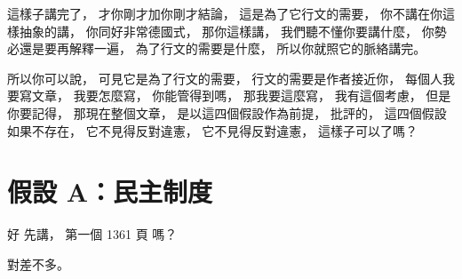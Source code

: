 \hypertarget{w06:cue:1276}{}這樣子講完了，
\hypertarget{w06:cue:1277}{}才你剛才加你剛才結論，
\hypertarget{w06:cue:1278}{}這是為了它行文的需要，
\hypertarget{w06:cue:1279}{}你不講在你這樣抽象的講，
\hypertarget{w06:cue:1280}{}你同好非常德國式，
\hypertarget{w06:cue:1281}{}那你這樣講，
\hypertarget{w06:cue:1282}{}我們聽不懂你要講什麼，
\hypertarget{w06:cue:1283}{}你勢必還是要再解釋一遍，
\hypertarget{w06:cue:1284}{}為了行文的需要是什麼，
\hypertarget{w06:cue:1285}{}所以你就照它的脈絡講完。

\hypertarget{w06:cue:1286}{}所以你可以說，
\hypertarget{w06:cue:1287}{}可見它是為了行文的需要，
\hypertarget{w06:cue:1288}{}行文的需要是作者接近你，
\hypertarget{w06:cue:1289}{}每個人我要寫文章，
\hypertarget{w06:cue:1290}{}我要怎麼寫，
\hypertarget{w06:cue:1291}{}你能管得到嗎，
\hypertarget{w06:cue:1292}{}那我要這麼寫，
\hypertarget{w06:cue:1293}{}我有這個考慮，
\hypertarget{w06:cue:1294}{}但是你要記得，
\hypertarget{w06:cue:1295}{}那現在整個文章，
\hypertarget{w06:cue:1296}{}是以這四個假設作為前提，
\hypertarget{w06:cue:1297}{}批評的，
\hypertarget{w06:cue:1298}{}這四個假設如果不存在，
\hypertarget{w06:cue:1299}{}它不見得反對違憲，
\hypertarget{w06:cue:1300}{}它不見得反對違憲，
\hypertarget{w06:cue:1301}{}這樣子可以了嗎？

\section{假設 A：民主制度}

\hypertarget{w06:cue:1302}{}好 先講，
\hypertarget{w06:cue:1303}{}第一個 1361 頁 嗎？

\hypertarget{w06:cue:1304}{}對差不多。

